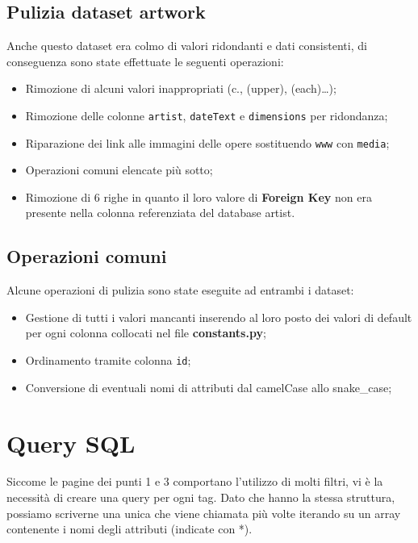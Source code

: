 \documentclass{ol-softwaremanual}
\begin{document}
\subsection{Pulizia dataset artwork}
Anche questo dataset era colmo di valori ridondanti e dati consistenti, di conseguenza sono state effettuate le seguenti operazioni:
\begin{itemize}
    \item Rimozione di alcuni valori inappropriati (c., (upper), (each)…);
    \item Rimozione delle colonne \verb|artist|, \verb|dateText| e \verb|dimensions| per ridondanza;
    \item Riparazione dei link alle immagini delle opere sostituendo \verb|www| con \verb|media|;
    \item Operazioni comuni elencate più sotto;
    \item Rimozione di 6 righe in quanto il loro valore di \textbf{Foreign Key} non era presente nella colonna referenziata del database artist.
\end{itemize}

\newpage
\subsection{Operazioni comuni}
Alcune operazioni di pulizia sono state eseguite ad entrambi i dataset:
\begin{itemize}
    \item Gestione di tutti i valori mancanti inserendo al loro posto dei valori di default per ogni colonna collocati nel 
    file \textbf{constants.py};
    \item Ordinamento tramite colonna \verb|id|;
    \item Conversione di eventuali nomi di attributi dal camelCase allo snake\_case;
\end{itemize}

\section{Query SQL}

Siccome le pagine dei punti 1 e 3 comportano l'utilizzo di molti filtri, vi è la necessità di creare una query per ogni tag. Dato che hanno la stessa 
struttura, possiamo scriverne una unica che viene chiamata più volte iterando su un array contenente i nomi degli attributi (indicate con *).
\end{document}
